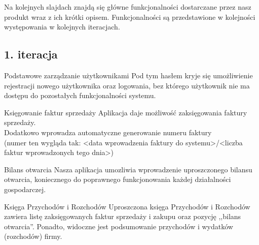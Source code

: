 \documentclass{beamer}
\begin{document}
  \begin{frame}
    \begin{block}{}
      Na kolejnych slajdach znajdą się główne funkcjonalności dostarczane przez nasz produkt wraz z ich krótki opisem. Funkcjonalności są przedstawione w kolejności występowania w kolejnych iteracjach.
    \end{block}
  \end{frame}
\subsection{1. iteracja}
  \begin{frame}
    \begin{block}{Podstawowe zarządzanie użytkownikami}
      Pod tym hasłem kryje się umożliwienie rejestracji nowego użytkownika oraz logowania, bez którego użytkownik nie ma dostępu do pozostałych funkcjonalności systemu.
    \end{block}
  \end{frame}
  \begin{frame}
    \begin{block}{Księgowanie faktur sprzedaży}
      Aplikacja daje możliwość zaksięgowania faktury sprzedaży.\\
      Dodatkowo wprowadza automatyczne generowanie numeru faktury\\
      (numer ten wygląda tak: <data wprowadzenia faktury do systemu>/<liczba faktur wprowadzonych tego dnia>)
    \end{block}
  \end{frame}
  \begin{frame}
    \begin{block}{Bilans otwarcia}
      Nasza aplikacja umozliwia wprowadzenie uproszczonego bilansu otwarcia, koniecznego do poprawnego funkcjonowania każdej działalności gospodarczej.
    \end{block}
  \end{frame}
  \begin{frame}
    \begin{block}{Księga Przychodów i Rozchodów}
      Uproszczona księga Przychodów i Rozchodów zawiera listę zaksięgowanych faktur sprzedaży i zakupu oraz pozycję ,,bilans otwarcia''. Ponadto, widoczne jest podsumowanie przychodów i wydatków (rozchodów) firmy.
    \end{block}
  \end{frame}
\end{document}
